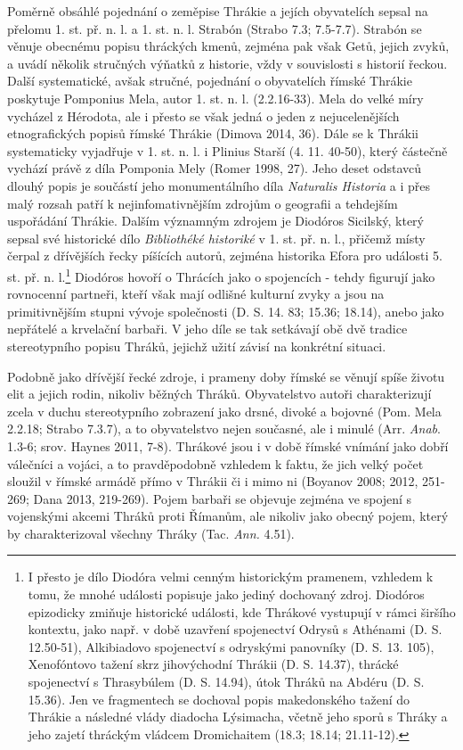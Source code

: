 Poměrně obsáhlé pojednání o zeměpise Thrákie a jejích obyvatelích sepsal na přelomu 1. st. př. n. l. a 1. st. n. l. Strabón (Strabo 7.3; 7.5-7.7). Strabón se věnuje obecnému popisu thráckých kmenů, zejména pak však Getů, jejich zvyků, a uvádí několik stručných výňatků z historie, vždy v souvislosti s historií řeckou. Další systematické, avšak stručné, pojednání o obyvatelích římské Thrákie poskytuje Pomponius Mela, autor 1. st. n. l. (2.2.16-33). Mela do velké míry vycházel z Hérodota, ale i přesto se však jedná o jeden z nejucelenějších etnografických popisů římské Thrákie (Dimova 2014, 36). Dále se k Thrákii systematicky vyjadřuje v 1. st. n. l. i Plinius Starší (4. 11. 40-50), který částečně vychází právě z díla Pomponia Mely (Romer 1998, 27). Jeho deset odstavců dlouhý popis je součástí jeho monumentálního díla {\em Naturalis Historia} a i přes malý rozsah patří k nejinfomativnějším zdrojům o geografii a tehdejším uspořádání Thrákie. Dalším významným zdrojem je Diodóros Sicilský, který sepsal své historické dílo {\em Bibliothéké historiké} v 1. st. př. n. l., přičemž místy čerpal z dřívějších řecky píšících autorů, zejména historika Efora pro události 5. st. př. n. l.\footnote{I přesto je dílo Diodóra velmi cenným historickým pramenem, vzhledem k tomu, že mnohé události popisuje jako jediný dochovaný zdroj. Diodóros epizodicky zmiňuje historické události, kde Thrákové vystupují v rámci širšího kontextu, jako např. v době uzavření spojenectví Odrysů s Athénami (D. S. 12.50-51), Alkibiadovo spojenectví s odryskými panovníky (D. S. 13. 105), Xenofóntovo tažení skrz jihovýchodní Thrákii (D. S. 14.37), thrácké spojenectví s Thrasybúlem (D. S. 14.94), útok Thráků na Abdéru (D. S. 15.36). Jen ve fragmentech se dochoval popis makedonského tažení do Thrákie a následné vlády diadocha Lýsimacha, včetně jeho sporů s Thráky a jeho zajetí thráckým vládcem Dromichaitem (18.3; 18.14; 21.11-12).} Diodóros hovoří o Thrácích jako o spojencích - tehdy figurují jako rovnocenní partneři, kteří však mají odlišné kulturní zvyky a jsou na primitivnějším stupni vývoje společnosti (D. S. 14. 83; 15.36; 18.14), anebo jako nepřátelé a krvelační barbaři. V jeho díle se tak setkávají obě dvě tradice stereotypního popisu Thráků, jejichž užití závisí na konkrétní situaci.

Podobně jako dřívější řecké zdroje, i prameny doby římské se věnují spíše životu elit a jejich rodin, nikoliv běžných Thráků. Obyvatelstvo autoři charakterizují zcela v duchu stereotypního zobrazení jako drsné, divoké a bojovné (Pom. Mela 2.2.18; Strabo 7.3.7), a to obyvatelstvo nejen současné, ale i minulé (Arr. {\em Anab}. 1.3-6; srov. Haynes 2011, 7-8). Thrákové jsou i v době římské vnímání jako dobří válečníci a vojáci, a to pravděpodobně vzhledem k faktu, že jich velký počet sloužil v římské armádě přímo v Thrákii či i mimo ni (Boyanov 2008; 2012, 251-269; Dana 2013, 219-269). Pojem barbaři se objevuje zejména ve spojení s vojenskými akcemi Thráků proti Římanům, ale nikoliv jako obecný pojem, který by charakterizoval všechny Thráky (Tac. {\em Ann.} 4.51).

